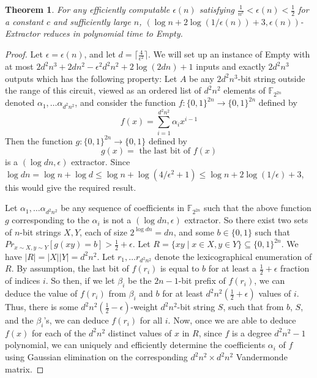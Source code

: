 \documentclass[11pt]{article}
\newtheorem{theorem}{Theorem}
\begin{document}
\begin{theorem}\label{thm:ext}
For any efficiently computable $\epsilon(n)$ satisfying $\frac{1}{n^c} < \epsilon(n) < \frac{1}{2}$ for a constant $c$ and sufficiently large $n$, {\sc $(\log n + 2\log(1/\epsilon(n)) + 3, \epsilon(n))$-Extractor} reduces in polynomial time to {\sc Empty}.
\end{theorem}
\begin{proof}
Let $\epsilon = \epsilon(n)$, and let $d = \lceil \frac{4}{\epsilon^2} \rceil$. 
We will set up an instance of {\sc Empty} with at most $2d^2n^3 + 2dn^2 - \epsilon^2d^2n^2 + 2\log(2dn) + 1$ inputs and exactly $2d^2n^3$ outputs which has the following property: Let $A$ be any $2d^2n^3$-bit string outside the range of this circuit, viewed as an ordered list of $d^2n^2$ elements of $\mathbb{F}_{2^{2n}}$ denoted $\alpha_1, \ldots \alpha_{d^2n^2}$, and consider the function $f: \{0,1\}^{2n} \rightarrow \{0,1\}^{2n}$ defined by
\[
f(x) = \sum\limits_{i=1}^{d^2n^2}\alpha_i x^{i-1}
\]
Then the function $g: \{0,1\}^{2n} \rightarrow \{0,1\}$ defined by 
\[
g(x) = \text{ the last bit of } f(x) 
\]
is a $(\log dn, \epsilon)$ extractor. Since $\log dn = \log n + \log d \leq \log n + \log(4/\epsilon^2 + 1) \leq \log n + 2\log(1/\epsilon) + 3$, this would give the required result.

Let $\alpha_1, \ldots \alpha_{d^2n^2}$ be any sequence of coefficients in $\mathbb{F}_{2^{2n}}$ such that the above function $g$ corresponding to the $\alpha_i$ is not a $(\log dn, \epsilon)$ extractor. So there exist two sets of $n$-bit strings $X,Y$, each of size $2^{\log dn} = dn$, and some $b \in \{0,1\}$ such that $Pr_{x \sim X, y \sim Y}[g(xy) = b] > \frac{1}{2} + \epsilon$. Let $R = \{xy \mid x \in X, y \in Y\} \subseteq \{0,1\}^{2n}$. We have $|R| = |X||Y| = d^2n^2$. Let $r_1, \ldots r_{d^2n^2}$ denote the lexicographical enumeration of $R$. By assumption, the last bit of $f(r_i)$ is equal to $b$ for at least a $\frac{1}{2} + \epsilon$ fraction of indices $i$. So then, if we let $\beta_i$ be the $2n-1$-bit prefix of $f(r_i)$, we can deduce the value of $f(r_i)$ from $\beta_i$ and $b$ for at least $d^2n^2(\frac{1}{2} + \epsilon)$ values of $i$. Thus, there is some $d^2n^2(\frac{1}{2} - \epsilon)$-weight $d^2n^2$-bit string $S$, such that from $b$, $S$, and the $\beta_i$'s, we can deduce $f(r_i)$ for all $i$. Now, once we are able to deduce $f(x)$ for each of the $d^2n^2$ distinct values of $x$ in $R$, since $f$ is a degree $d^2n^2-1$ polynomial, we can uniquely and efficiently determine the coefficients $\alpha_i$ of $f$ using Gaussian elimination on the corresponding $d^2n^2 \times d^2n^2$ Vandermonde matrix.


\end{proof}
\end{document}
